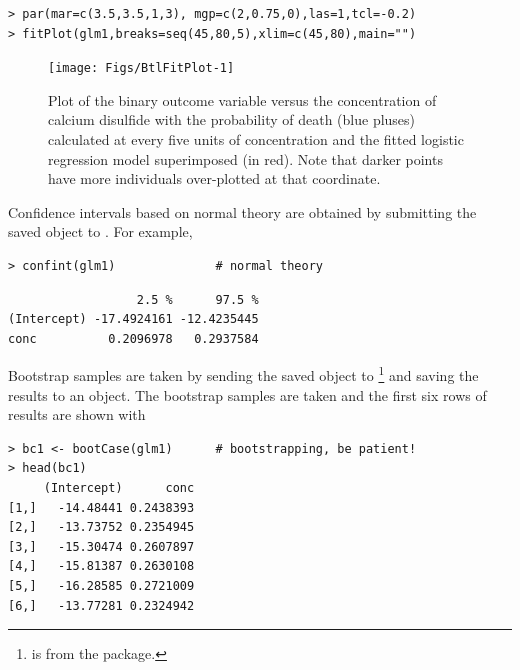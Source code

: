 \documentclass[10pt,openany]{book}\usepackage[]{graphicx}\usepackage[]{color}
\makeatletter
\newenvironment{kframe}{%
 \def\at@end@of@kframe{}%
 \ifinner\ifhmode%
  \def\at@end@of@kframe{\end{minipage}}%
  \begin{minipage}{\columnwidth}%
 \fi\fi%
 \def\FrameCommand##1{\hskip\@totalleftmargin \hskip-\fboxsep
 \colorbox{shadecolor}{##1}\hskip-\fboxsep
     \hskip-\linewidth \hskip-\@totalleftmargin \hskip\columnwidth}%
 \MakeFramed {\advance\hsize-\width
   \@totalleftmargin\z@ \linewidth\hsize
   \@setminipage}}%
 {\par\unskip\endMakeFramed%
 \at@end@of@kframe}
\newenvironment{knitrout}{}{} %
\makeatother
\begin{document}
\begin{knitrout}
\color{fgcolor}\begin{kframe}
\begin{verbatim}
> par(mar=c(3.5,3.5,1,3), mgp=c(2,0.75,0),las=1,tcl=-0.2)
> fitPlot(glm1,breaks=seq(45,80,5),xlim=c(45,80),main="")
\end{verbatim}
\end{kframe}\begin{figure}[hbtp]

{\centering \texttt{[image: Figs/BtlFitPlot-1]} 

}

\caption[Plot of the binary outcome variable versus the concentration of calcium disulfide with the probability of death (blue pluses) calculated at every five units of concentration and the fitted logistic regression model superimposed (in red)]{Plot of the binary outcome variable versus the concentration of calcium disulfide with the probability of death (blue pluses) calculated at every five units of concentration and the fitted logistic regression model superimposed (in red).  Note that darker points have more individuals over-plotted at that coordinate.}\label{fig:BtlFitPlot}
\end{figure}


\end{knitrout}

Confidence intervals based on normal theory are obtained by submitting the saved  object to .  For example,
\begin{knitrout}
\color{fgcolor}\begin{kframe}
\begin{verbatim}
> confint(glm1)              # normal theory
\end{verbatim}


{\ttfamily\noindent\itshape\color{messagecolor}{Waiting for profiling to be done...}}\begin{verbatim}
                  2.5 %      97.5 %
(Intercept) -17.4924161 -12.4235445
conc          0.2096978   0.2937584
\end{verbatim}
\end{kframe}
\end{knitrout}

Bootstrap samples are taken by sending the saved  object to \footnote{ is from the  package.} and saving the results to an object.  The bootstrap samples are taken and the first six rows of results are shown with
\begin{knitrout}
\color{fgcolor}\begin{kframe}
\begin{verbatim}
> bc1 <- bootCase(glm1)      # bootstrapping, be patient!
> head(bc1)
     (Intercept)      conc
[1,]   -14.48441 0.2438393
[2,]   -13.73752 0.2354945
[3,]   -15.30474 0.2607897
[4,]   -15.81387 0.2630108
[5,]   -16.28585 0.2721009
[6,]   -13.77281 0.2324942
\end{verbatim}
\end{kframe}
\end{knitrout}
\end{document}

